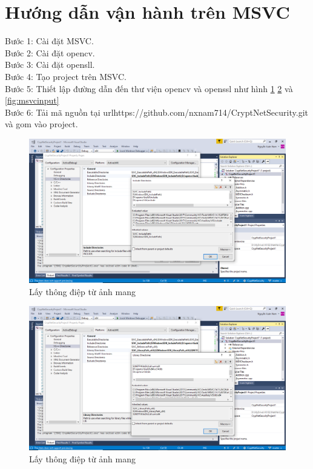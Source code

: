 \documentclass[a4paper]{article}
\begin{document}
\section{Hướng dẫn vận hành trên MSVC}
	Bước 1: Cài đặt MSVC.\\
    Bước 2: Cài đặt opencv.\\
    Bước 3: Cài đặt opensll.\\
    Bước 4: Tạo project trên MSVC.\\
    Bước 5: Thiết lập đường dẫn đến thư viện opencv và openssl như hình \ref{fig:msvcinclude} \ref{fig:msvclib} và \ref{fig:msvcinput}\\
    Bước 6: Tải mã nguồn tại url{https://github.com/nxnam714/CryptNetSecurity.git} và gom vào project.
    \begin{figure}[htp]
        \centering
        \includegraphics[scale=0.4]{msvcinclude.png}
        \caption{Lấy thông điệp từ ảnh mang}
        \label{fig:msvcinclude}
    \end{figure}
    \begin{figure}[htp]
        \centering
        \includegraphics[scale=0.4]{msvclib.png}
        \caption{Lấy thông điệp từ ảnh mang}
        \label{fig:msvclib}
    \end{figure}
\end{document}
